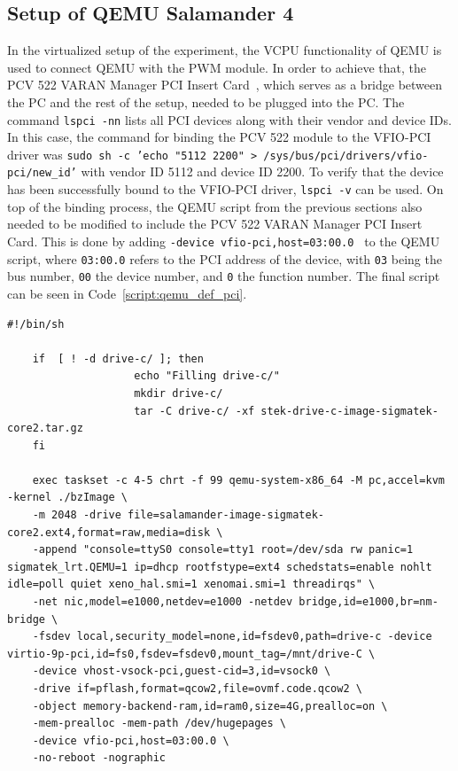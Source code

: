 \documentclass[MMR,Master,english]{twbook}
\begin{document}
\subsection{Setup of QEMU Salamander 4}\label{subsec:setup_experiment_virtualized}
In the virtualized setup of the experiment, the VCPU functionality of QEMU is used to connect QEMU with the PWM module. In order to achieve that, the PCV 522 VARAN Manager PCI Insert Card~\cite{ControlsHMIsSIGMATEK}, which serves as a bridge between the PC and the rest of the setup, needed to be plugged into the PC. The command \texttt{lspci -nn} lists all PCI devices along with their vendor and device IDs. In this case, the command for binding the PCV 522 module to the VFIO-PCI driver was \texttt{sudo sh -c 'echo "5112 2200" > /sys/bus/pci/drivers/vfio-pci/new\_id'} with vendor ID 5112 and device ID 2200.  To verify that the device has been successfully bound to the VFIO-PCI driver, \texttt{lspci -v} can be used. On top of the binding process, the QEMU script from the previous sections also needed to be modified to include the PCV 522 VARAN Manager PCI Insert Card. This is done by adding \texttt{-device\ vfio-pci,host=03:00.0 } to the QEMU script, where \texttt{03:00.0} refers to the PCI address of the device, with \texttt{03} being the bus number, \texttt{00} the device number, and \texttt{0} the function number. The final script can be seen in Code~\ref{script:qemu_def_pci}.

\vspace{2em}
\begin{lstlisting}[name={Include PCI in QEMU script for Salamander 4 virtualization},label={script:qemu_def_pci}]
	#!/bin/sh

	if  [ ! -d drive-c/ ]; then
					echo "Filling drive-c/"
					mkdir drive-c/
					tar -C drive-c/ -xf stek-drive-c-image-sigmatek-core2.tar.gz
	fi
		
	exec taskset -c 4-5 chrt -f 99 qemu-system-x86_64 -M pc,accel=kvm -kernel ./bzImage \
	-m 2048 -drive file=salamander-image-sigmatek-core2.ext4,format=raw,media=disk \
	-append "console=ttyS0 console=tty1 root=/dev/sda rw panic=1 sigmatek_lrt.QEMU=1 ip=dhcp rootfstype=ext4 schedstats=enable nohlt idle=poll quiet xeno_hal.smi=1 xenomai.smi=1 threadirqs" \
	-net nic,model=e1000,netdev=e1000 -netdev bridge,id=e1000,br=nm-bridge \
	-fsdev local,security_model=none,id=fsdev0,path=drive-c -device virtio-9p-pci,id=fs0,fsdev=fsdev0,mount_tag=/mnt/drive-C \
	-device vhost-vsock-pci,guest-cid=3,id=vsock0 \
	-drive if=pflash,format=qcow2,file=ovmf.code.qcow2 \
	-object memory-backend-ram,id=ram0,size=4G,prealloc=on \
	-mem-prealloc -mem-path /dev/hugepages \
	-device vfio-pci,host=03:00.0 \
	-no-reboot -nographic
\end{lstlisting}
\end{document}
